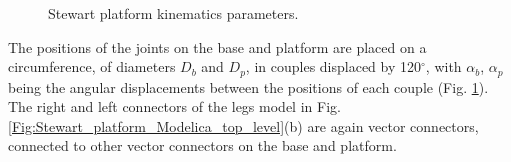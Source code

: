 \documentclass[]{interact}
\theoremstyle{plain}%
\theoremstyle{definition}
\theoremstyle{remark}
\begin{document}
\begin{figure}
\centering
{}\hspace{1cm}
\caption{Stewart platform kinematics parameters.} \label{Fig:Stewart_platform_kinematics_parameters}
\end{figure}
The positions of the joints on the base and platform are placed on a circumference, of diameters $D_b$ and $D_p$, in couples displaced by 120$^\circ$, with $\alpha_b$, $\alpha_p$ being the angular displacements between the positions of each couple (Fig. \ref{Fig:Stewart_platform_kinematics_parameters}). The right and left connectors of the legs model in Fig. \ref{Fig:Stewart_platform_Modelica_top_level}(b) are again vector connectors, connected to other vector connectors on the base and platform.
\end{document}
